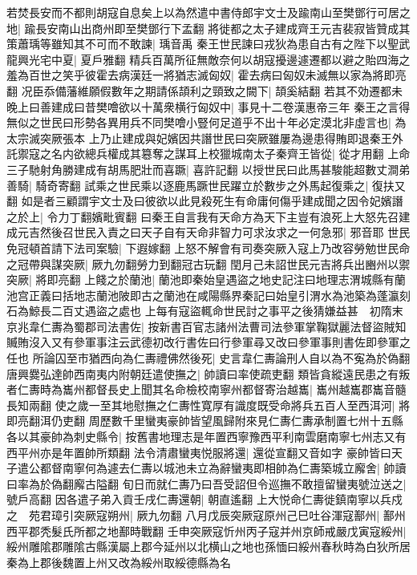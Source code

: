 若焚長安而不都則胡寇自息矣上以為然遣中書侍郎宇文士及踰南山至樊鄧行可居之地|{
	踰長安南山出商州即至樊鄧行下孟翻}
將徙都之太子建成齊王元吉裴寂皆贊成其策蕭瑀等雖知其不可而不敢諫|{
	瑀音禹}
秦王世民諫曰戎狄為患自古有之陛下以聖武龍興光宅中夏|{
	夏戶雅翻}
精兵百萬所征無敵奈何以胡寇擾邊遽遷都以避之貽四海之羞為百世之笑乎彼霍去病漢廷一將猶志滅匈奴|{
	霍去病曰匈奴未滅無以家為將即亮翻}
况臣忝備藩維願假數年之期請係頡利之頸致之闕下|{
	頡奚結翻}
若其不効遷都未晚上曰善建成曰昔樊噲欲以十萬衆横行匈奴中|{
	事見十二卷漢惠帝三年}
秦王之言得無似之世民曰形勢各異用兵不同樊噲小豎何足道乎不出十年必定漠北非虛言也|{
	為太宗滅突厥張本}
上乃止建成與妃嬪因共譖世民曰突厥雖屢為邊患得賄即退秦王外託禦寇之名内欲總兵權成其簒奪之謀耳上校獵城南太子秦齊王皆從|{
	從才用翻}
上命三子馳射角勝建成有胡馬肥壯而喜蹶|{
	喜許記翻}
以授世民曰此馬甚駿能超數丈澗弟善騎|{
	騎奇寄翻}
試乘之世民乘以逐鹿馬蹶世民躍立於數步之外馬起復乘之|{
	復扶又翻}
如是者三顧謂宇文士及曰彼欲以此見殺死生有命庸何傷乎建成聞之因令妃嬪譖之於上|{
	令力丁翻嬪毗賓翻}
曰秦王自言我有天命方為天下主豈有浪死上大怒先召建成元吉然後召世民入責之曰天子自有天命非智力可求汝求之一何急邪|{
	邪音耶}
世民免冠頓首請下法司案驗|{
	下遐嫁翻}
上怒不解會有司奏突厥入寇上乃改容勞勉世民命之冠帶與謀突厥|{
	厥九勿翻勞力到翻冠古玩翻}
閏月己未詔世民元吉將兵出豳州以禦突厥|{
	將即亮翻}
上餞之於蘭池|{
	蘭池即秦始皇遇盜之地史記注曰地理志渭城縣有蘭池宫正義曰括地志蘭池陂即古之蘭池在咸陽縣界秦記曰始皇引渭水為池築為蓬瀛刻石為鯨長二百丈遇盜之處也}
上每有寇盜輒命世民討之事平之後猜嫌益甚　初隋末京兆韋仁夀為蜀郡司法書佐|{
	按新書百官志諸州法曹司法參軍掌鞠獄麗法督盜賊知贓賄沒入又有參軍事注云武德初改行書佐曰行參軍尋又改曰參軍事則書佐即參軍之任也}
所論囚至市猶西向為仁夀禮佛然後死|{
	史言韋仁夀論刑人自以為不寃為於偽翻}
唐興爨弘達帥西南夷内附朝廷遣使撫之|{
	帥讀曰率使疏吏翻}
類皆貪縱遠民患之有叛者仁夀時為巂州都督長史上聞其名命檢校南寧州都督寄治越巂|{
	巂州越巂郡巂音髓長知兩翻}
使之歲一至其地慰撫之仁夀性寛厚有識度既受命將兵五百人至西洱河|{
	將即亮翻洱仍吏翻}
周歷數千里蠻夷豪帥皆望風歸附來見仁夀仁夀承制置七州十五縣各以其豪帥為刺史縣令|{
	按舊書地理志是年置西寧豫西平利南雲磨南寧七州志又有西平州亦是年置帥所類翻}
法令清肅蠻夷悦服將還|{
	還從宣翻又音如字}
豪帥皆曰天子遣公都督南寧何為遽去仁夀以城池未立為辭蠻夷即相帥為仁夀築城立廨舍|{
	帥讀曰率為於偽翻廨古隘翻}
旬日而就仁夀乃曰吾受詔但令巡撫不敢擅留蠻夷號泣送之|{
	號戶高翻}
因各遣子弟入貢壬戌仁夀還朝|{
	朝直遙翻}
上大悦命仁夀徙鎮南寧以兵戍之　苑君璋引突厥寇朔州|{
	厥九勿翻}
八月戊辰突厥寇原州己巳吐谷渾寇鄯州|{
	鄯州西平郡秃髮氏所都之地鄯時戰翻}
壬申突厥寇忻州丙子寇并州京師戒嚴戊寅寇綏州|{
	綏州雕隂郡雕隂古縣漢屬上郡今延州以北横山之地也孫愐曰綏州春秋時為白狄所居秦為上郡後魏置上州又改為綏州取綏德縣為名}

